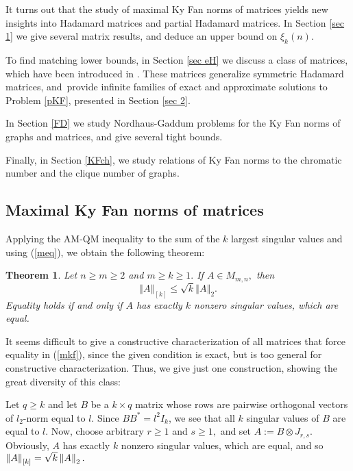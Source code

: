 \documentclass[12pt]{article}%
\newtheorem{theorem}{Theorem}[section]
\begin{document}
It turns out that the study of maximal Ky Fan norms of matrices yields new
insights into Hadamard matrices and partial Hadamard matrices. In Section
\ref{sec 1} we give several matrix results, and deduce an upper bound on
$\xi_{k}\left(  n\right)  $.

To find matching lower bounds, in Section \ref{sec eH} we discuss a class of
matrices, which have been introduced in \cite{Nik15b}. These matrices
generalize symmetric Hadamard matrices, and\ provide infinite families of
exact and approximate solutions to Problem \ref{pKF}, presented in Section
\ref{sec 2}.

In Section \ref{FD} we study Nordhaus-Gaddum problems for the Ky Fan norms of
graphs and matrices, and give several tight bounds.

Finally, in Section \ref{KFch}, we study relations of Ky Fan norms to the
chromatic number and the clique number of graphs.

\subsection{\label{sec 1}Maximal Ky Fan norms of matrices}

Applying the AM-QM inequality to the sum of the $k$ largest singular values
and using (\ref{meq}), we obtain the following theorem:

\begin{theorem}
\label{mo1}Let $n\geq m\geq2$ and $m\geq k\geq1.$ If $A\in M_{m,n},$ then
\begin{equation}
\left\Vert A\right\Vert _{\left[  k\right]  }\leq\sqrt{k}\left\Vert
A\right\Vert _{2}. \label{mkf}%
\end{equation}
Equality holds if and only if $A$ has exactly $k$ nonzero singular values,
which are equal.
\end{theorem}

It seems difficult to give a constructive characterization of all matrices
that force equality in (\ref{mkf}), since the given condition is exact, but is
too general for constructive characterization. Thus, we give just one
construction, showing the great diversity of this class:

Let $q\geq k$ and let $B$ be a $k\times q$ matrix whose rows are pairwise
orthogonal vectors of $l_{2}$-norm equal to $l$. Since $BB^{\ast}=l^{2}I_{k}$,
we see that all $k$ singular values of $B$ are equal to $l$. Now, choose
arbitrary $r\geq1$ and $s\geq1,$ and set $A:=B\otimes J_{r,s}.$ Obviously, $A$
has exactly $k$ nonzero singular values, which are equal, and so $\left\Vert
A\right\Vert _{\left[  k\right]  }=\sqrt{k}\left\Vert A\right\Vert
_{2}.\medskip$
\end{document}
